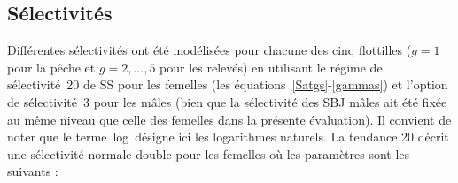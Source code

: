 \documentclass[11pt]{book}
\newcommand{\angL}{\guillemotleft\,}
\newcommand{\angR}{\,\guillemotright}
\begin{document}
\subsection{S\'{e}lectivit\'{e}s} \label{ss:select}

Diff\'{e}rentes s\'{e}lectivit\'{e}s ont \'{e}t\'{e} mod\'{e}lis\'{e}es pour chacune des cinq flottilles ($g = 1$ pour la p\^{e}che et $g = 2,...,5$ pour les relev\'{e}s) en utilisant le r\'{e}gime de s\'{e}lectivit\'{e}~20 de SS pour les femelles (les \'{e}quations~\ref{Satgs}-\ref{gammas}) et l'option de s\'{e}lectivit\'{e}~3 pour les m\^{a}les (bien que la s\'{e}lectivit\'{e} des SBJ m\^{a}les ait \'{e}t\'{e} fix\'{e}e au m\^{e}me niveau que celle des femelles dans la pr\'{e}sente \'{e}valuation).
Il convient de noter que le terme \angL log\angR{} d\'{e}signe ici les logarithmes naturels. %
La tendance 20 d\'{e}crit une s\'{e}lectivit\'{e} normale double pour les femelles o\`{u} les param\`{e}tres sont les suivants :
\end{document}
